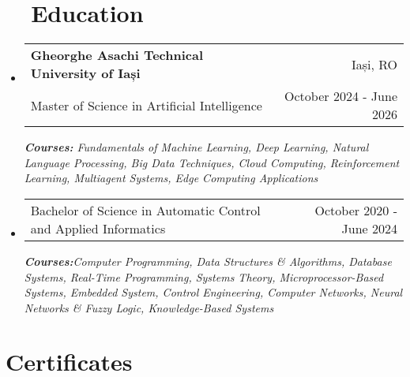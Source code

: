 \documentclass[a4paper,11pt]{article}
\makeatletter
\newcommand{\oracleDataScienceLink}{https://catalog-education.oracle.com/pls/certview/sharebadge?id=your-badge-id}
\newcommand{\oracleGenAILink}{https://catalog-education.oracle.com/pls/certview/sharebadge?id=your-badge-id}
\newcommand{\oracleVectorSearchLink}{https://catalog-education.oracle.com/pls/certview/sharebadge?id=your-badge-id}
\newcommand{\oracleAIFoundationsLink}{https://catalog-education.oracle.com/pls/certview/sharebadge?id=your-badge-id}
\newcommand{\resumeSubheading}[4]{
  \vspace{-1pt}\item
    \begin{tabular*}{0.97\textwidth}{l@{\extracolsep{\fill}}r}
      \color{NavyBlue}\textbf{#1} & #2 \\
      #3 & #4 \\
    \end{tabular*}\vspace{-5pt}
}
\newcommand{\resumeSubheadingSimple}[2]{
  \vspace{-1pt}\item
    \begin{tabular*}{0.97\textwidth}{l@{\extracolsep{\fill}}r}
      #1 & #2 \\
    \end{tabular*}\vspace{-5pt}
}
\newcommand{\resumeSubHeadingListStart}{\begin{itemize}[leftmargin=*, label={}]}
\newcommand{\resumeSubHeadingListEnd}{\end{itemize}}
\makeatother
\begin{document}
\section{~~Education}
\resumeSubHeadingListStart
  \resumeSubheading
    {Gheorghe Asachi Technical University of Iași}{Iași, RO}
    {Master of Science in Artificial Intelligence}{October 2024 - June 2026}
      {\par\footnotesize \textit{\textbf{Courses:} Fundamentals of Machine Learning, Deep Learning, Natural Language Processing, Big Data Techniques, Cloud Computing, Reinforcement Learning, Multiagent Systems, Edge Computing Applications}}
  \resumeSubheadingSimple
    {Bachelor of Science in Automatic Control and Applied Informatics}{October 2020 - June 2024}
     {\par\footnotesize  \textit{\textbf{Courses:}Computer Programming, Data Structures \& Algorithms, Database Systems, Real-Time Programming, Systems Theory, Microprocessor-Based Systems, Embedded System, Control Engineering, Computer Networks, Neural Networks \& Fuzzy Logic, Knowledge-Based Systems}}
  \resumeSubHeadingListEnd    
\section{Certificates}

\vspace{-5pt}
\end{document}
